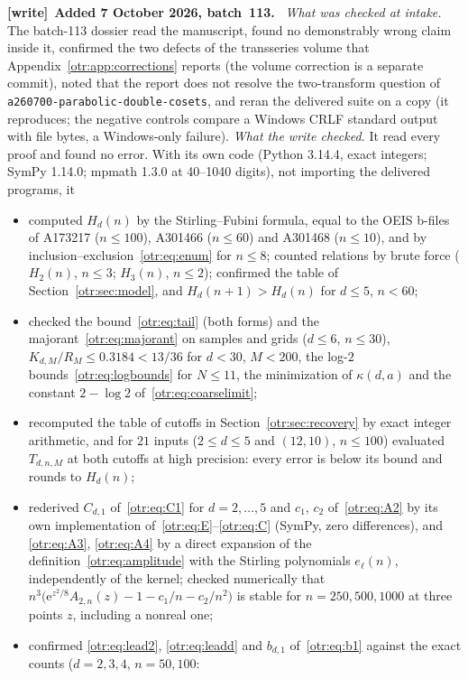 \documentclass[11pt,a4paper]{article}
\theoremstyle{definition}\newtheorem{definition}[theorem]{Definition}
\theoremstyle{remark}\newtheorem{remark}[theorem]{Remark}
\newcommand{\e}{\mathrm e}
\newcommand{\file}[1]{\nolinkurl{#1}}
\newenvironment{writenote}[1][]{\par\smallskip\begingroup\small
 \noindent\textbf{[write]}\if\relax\detokenize{#1}\relax\else~\textbf{#1.}\fi\ }%
 {\par\endgroup\smallskip}
\begin{document}
\begin{writenote}[Added 7 October 2026, batch~113]
\emph{What was checked at intake.} The batch-113 dossier read the manuscript,
found no demonstrably wrong claim inside it, confirmed the two defects of the
transseries volume that Appendix~\ref{otr:app:corrections} reports (the
volume correction is a separate commit), noted that the report does not
resolve the two-transform question of \file{a260700-parabolic-double-cosets},
and reran the delivered suite on a copy (it reproduces; the negative controls
compare a Windows CRLF standard output with file bytes, a Windows-only
failure). \emph{What the write checked.} It read every proof and found no
error. With its own code (Python 3.14.4, exact integers; SymPy 1.14.0; mpmath
1.3.0 at 40--1040 digits), not importing the delivered programs, it
\begin{itemize}\raggedright
\item computed $H_d(n)$ by the Stirling--Fubini formula, equal to the OEIS
b-files of A173217 ($n\le100$), A301466 ($n\le60$) and A301468 ($n\le10$), and
by inclusion--exclusion~\eqref{otr:eq:enum} for $n\le8$; counted relations by
brute force ($H_2(n)$, $n\le3$; $H_3(n)$, $n\le2$); confirmed the table of
Section~\ref{otr:sec:model}, and $H_d(n+1)>H_d(n)$ for $d\le5$, $n<60$;
\item checked the bound~\eqref{otr:eq:tail} (both forms) and the
majorant~\eqref{otr:eq:majorant} on samples and grids ($d\le6$, $n\le30$),
$K_{d,M}/R_M\le0.3184<13/36$ for $d<30$, $M<200$, the log-$2$
bounds~\eqref{otr:eq:logbounds} for $N\le11$, the minimization of
$\kappa(d,a)$ and the constant $2-\log2$ of~\eqref{otr:eq:coarselimit};
\item recomputed the table of cutoffs in Section~\ref{otr:sec:recovery} by
exact integer arithmetic, and for $21$ inputs ($2\le d\le5$ and $(12,10)$,
$n\le100$) evaluated $T_{d,n,M}$ at both cutoffs at high precision: every error
is below its bound and rounds to $H_d(n)$;
\item rederived $C_{d,1}$ of~\eqref{otr:eq:C1} for $d=2,\ldots,5$ and $c_1$,
$c_2$ of~\eqref{otr:eq:A2} by its own implementation
of~\eqref{otr:eq:E}--\eqref{otr:eq:C} (SymPy, zero differences), and
\eqref{otr:eq:A3}, \eqref{otr:eq:A4} by a direct expansion of the
definition~\eqref{otr:eq:amplitude} with the Stirling polynomials
$e_\ell(n)$, independently of the kernel; checked numerically that
$n^3\bigl(\e^{z^2/8}A_{2,n}(z)-1-c_1/n-c_2/n^2\bigr)$ is stable for
$n=250,500,1000$ at three points $z$, including a nonreal one;
\item confirmed \eqref{otr:eq:lead2}, \eqref{otr:eq:leadd} and
$b_{d,1}$ of~\eqref{otr:eq:b1} against the exact counts ($d=2,3,4$, $n=50,100$:

\end{itemize}
\end{writenote}
\end{document}
